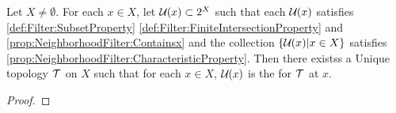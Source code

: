\begin{prop}
\label{prop:TopFromNbhFilter}
Let $X \neq \emptyset$. 
For each $x \in X$, let 
$\mathcal{U}_{}(x) \subset 2^{X}$ such that 
each $\mathcal{U}_{}(x)$ satisfies 
\ref{def:Filter:SubsetProperty}
\ref{def:Filter:FiniteIntersectionProperty}
and
\ref{prop:NeighborhoodFilter:Containsx}
and the collection
$\{ \mathcal{U}_{}(x) | x \in X \}$ 
satisfies 
\ref{prop:NeighborhoodFilter:CharacteristicProperty}.
Then there existss a Unique topology $\mathcal{T}$ 
on $X$ such that 
for each $x \in X$, 
$\mathcal{U}_{}(x)$ is the 
\NeighborhoodFilter for $\mathcal{T}$ at $x$. 
\begin{proof}
\end{proof}

\end{prop}
